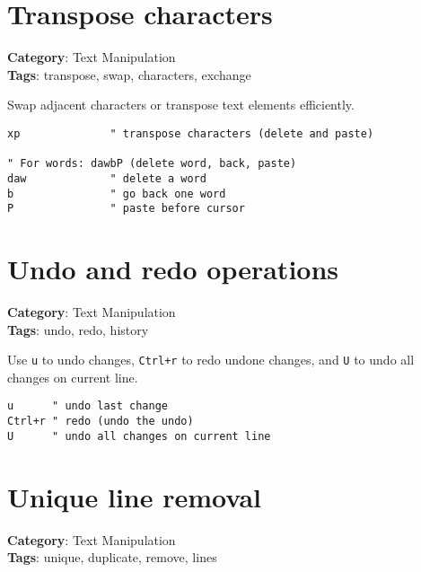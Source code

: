 {{{{{{{{{{{{{{\section{Transpose characters}

\textbf{Category}: Text Manipulation\\ \textbf{Tags}: transpose, swap, characters, exchange
\vspace{0.5cm}

Swap adjacent characters or transpose text elements efficiently.

\begin{Exa*}{}
\begin{Verbatim}[fontsize=\footnotesize, breaklines, breakanywhere]
xp              " transpose characters (delete and paste)

" For words: dawbP (delete word, back, paste)
daw             " delete a word  
b               " go back one word
P               " paste before cursor
\end{Verbatim}
\end{Exa*}

\section{Undo and redo operations}

\textbf{Category}: Text Manipulation\\ \textbf{Tags}: undo, redo, history
\vspace{0.5cm}

Use {\footnotesize \Verb§u§} to undo changes, {\footnotesize \Verb§Ctrl+r§} to redo undone changes, and {\footnotesize \Verb§U§} to undo all changes on current line.

\begin{Exa*}{}
\begin{Verbatim}[fontsize=\footnotesize, breaklines, breakanywhere]
u      " undo last change
Ctrl+r " redo (undo the undo)
U      " undo all changes on current line
\end{Verbatim}
\end{Exa*}

\section{Unique line removal}

\textbf{Category}: Text Manipulation\\ \textbf{Tags}: unique, duplicate, remove, lines
\vspace{0.5cm}

}}}}}}}}}}}}}}
